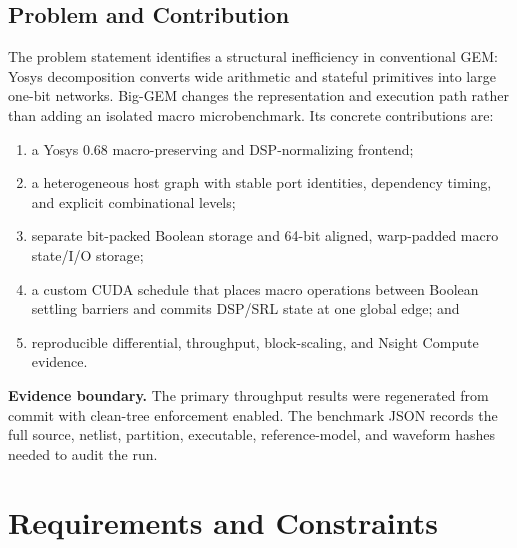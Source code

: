 \documentclass[11pt,a4paper]{article}
\newcommand{\code}[1]{\texttt{\detokenize{#1}}}
\begin{document}
\subsection{Problem and Contribution}

The problem statement identifies a structural inefficiency in conventional GEM:
Yosys decomposition converts wide arithmetic and stateful primitives into large
one-bit networks.  Big-GEM changes the representation and execution path rather
than adding an isolated macro microbenchmark.  Its concrete contributions are:

\begin{enumerate}
  \item a Yosys 0.68 macro-preserving and DSP-normalizing frontend;
  \item a heterogeneous host graph with stable port identities, dependency timing,
        and explicit combinational levels;
  \item separate bit-packed Boolean storage and 64-bit aligned, warp-padded macro
        state/I/O storage;
  \item a custom CUDA schedule that places macro operations between Boolean
        settling barriers and commits DSP/SRL state at one global edge; and
  \item reproducible differential, throughput, block-scaling, and Nsight Compute
        evidence.
\end{enumerate}

\begin{warningbox}
\textbf{Evidence boundary.}  The primary throughput results were regenerated
from commit \code{8c48130} with clean-tree enforcement enabled.  The benchmark
JSON records the full source, netlist, partition, executable, reference-model,
and waveform hashes needed to audit the run.
\end{warningbox}

\section{Requirements and Constraints}
\end{document}
